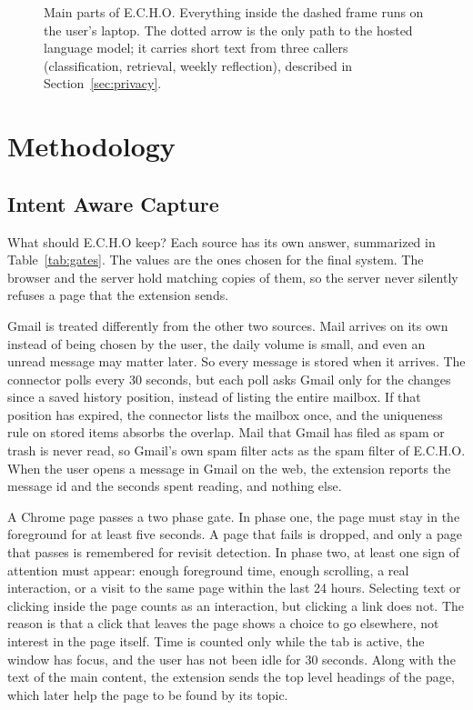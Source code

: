 \documentclass[conference]{IEEEtran}
\begin{document}
\begin{figure}[t]
\caption{Main parts of E.C.H.O. Everything inside the dashed frame runs on the user's laptop. The dotted arrow is the only path to the hosted language model; it carries short text from three callers (classification, retrieval, weekly reflection), described in Section~\ref{sec:privacy}.}
\label{fig:arch}
\end{figure}

\section{Methodology}\label{sec:method}
\subsection{Intent Aware Capture}
What should E.C.H.O keep? Each source has its own answer, summarized in Table~\ref{tab:gates}. The values are the ones chosen for the final system. The browser and the server hold matching copies of them, so the server never silently refuses a page that the extension sends.

Gmail is treated differently from the other two sources. Mail arrives on its own instead of being chosen by the user, the daily volume is small, and even an unread message may matter later. So every message is stored when it arrives. The connector polls every 30 seconds, but each poll asks Gmail only for the changes since a saved history position, instead of listing the entire mailbox. If that position has expired, the connector lists the mailbox once, and the uniqueness rule on stored items absorbs the overlap. Mail that Gmail has filed as spam or trash is never read, so Gmail's own spam filter acts as the spam filter of E.C.H.O. When the user opens a message in Gmail on the web, the extension reports the message id and the seconds spent reading, and nothing else.

A Chrome page passes a two phase gate. In phase one, the page must stay in the foreground for at least five seconds. A page that fails is dropped, and only a page that passes is remembered for revisit detection. In phase two, at least one sign of attention must appear: enough foreground time, enough scrolling, a real interaction, or a visit to the same page within the last 24 hours. Selecting text or clicking inside the page counts as an interaction, but clicking a link does not. The reason is that a click that leaves the page shows a choice to go elsewhere, not interest in the page itself. Time is counted only while the tab is active, the window has focus, and the user has not been idle for 30 seconds. Along with the text of the main content, the extension sends the top level headings of the page, which later help the page to be found by its topic.
\end{document}
